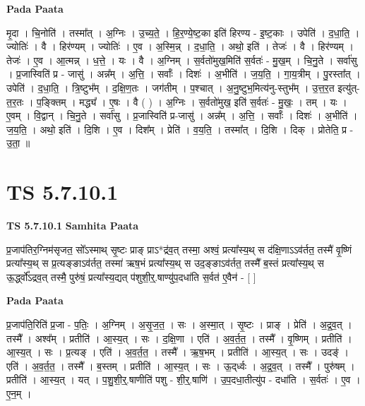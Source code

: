 \documentclass[17pt]{extarticle}
\begin{document}
\textbf{Pada Paata} \newline

मृ॒दा । चि॒नोति॑ । तस्मा᳚त् । अ॒ग्निः । उ॒च्य॒ते॒ । हि॒र॒ण्ये॒ष्ट॒का इति॑ हिरण्य - इ॒ष्ट॒काः । उपेति॑ । द॒धा॒ति॒ । ज्योतिः॑ । वै । हिर॑ण्यम् । ज्योतिः॑ । ए॒व । अ॒स्मि॒न्न् । द॒धा॒ति॒ । अथो॒ इति॑ । तेजः॑ । वै । हिर॑ण्यम् । तेजः॑ । ए॒व । आ॒त्मन्न् । ध॒त्ते॒ । यः । वै । अ॒ग्निम् । स॒र्वतो॑मुख॒मिति॑ स॒र्वतः॑ - मु॒ख॒म् । चि॒नु॒ते । सर्वा॑सु । प्र॒जास्विति॑ प्र - जासु॑ । अन्न᳚म् । अ॒त्ति॒ । सर्वाः᳚ । दिशः॑ । अ॒भीति॑ । ज॒य॒ति॒ । गा॒य॒त्रीम् । पु॒रस्ता᳚त् । उपेति॑ । द॒धा॒ति॒ । त्रि॒ष्टुभ᳚म् । द॒क्षि॒ण॒तः । जग॑तीम् । प॒श्चात् । अ॒नु॒ष्टुभ॒मित्य॑नु-स्तुभ᳚म् । उ॒त्त॒र॒त इत्यु॑त्-त॒र॒तः । प॒ङ्क्तिम् । मद्ध्य᳚ । ए॒षः । वै ( ) । अ॒ग्निः । स॒र्वतो॑मुख॒ इति॑ स॒र्वतः॑ - मु॒खः॒ । तम् । यः । ए॒वम् । वि॒द्वान् । चि॒नु॒ते । सर्वा॑सु । प्र॒जास्विति॑ प्र-जासु॑ । अन्न᳚म् । अ॒त्ति॒ । सर्वाः᳚ । दिशः॑ । अ॒भीति॑ । ज॒य॒ति॒ । अथो॒ इति॑ । दि॒शि । ए॒व । दिश᳚म् । प्रेति॑ । व॒य॒ति॒ । तस्मा᳚त् । दि॒शि । दिक् । प्रोतेति॒ प्र - उ॒ता॒ ॥  \newline




\section*{ TS 5.7.10.1 }

\textbf{TS 5.7.10.1 } \newline
\textbf{Samhita Paata} \newline

प्र॒जाप॑तिर॒ग्निम॑सृजत॒ सो᳚ऽस्माथ् सृ॒ष्टः प्राङ् प्राऽ*द्र॑व॒त् तस्मा॒ अश्वं॒ प्रत्या᳚स्य॒थ् स द॑क्षि॒णाऽऽव॑र्तत॒ तस्मै॑ वृ॒ष्णिं प्रत्या᳚स्य॒थ् स प्र॒त्यङ्ङाऽव॑र्तत॒ तस्मा॑ ऋष॒भं प्रत्या᳚स्य॒थ् स उद॒ङ्ङाऽव॑र्तत॒ तस्मै᳚ ब॒स्तं प्रत्या᳚स्य॒थ् स ऊ॒र्द्ध्वो᳚ऽद्रव॒त् तस्मै॒ पुरु॑षं॒ प्रत्या᳚स्य॒द्यत् प॑शुशी॒र्॒.षाण्यु॑प॒दधा॑ति स॒र्वत॑ ए॒वैन॑ - [  ] \newline

\textbf{Pada Paata} \newline

प्र॒जाप॑ति॒रिति॑ प्र॒जा - प॒तिः॒ । अ॒ग्निम् । अ॒सृ॒ज॒त॒ । सः । अ॒स्मा॒त् । सृ॒ष्टः । प्राङ् । प्रेति॑ । अ॒द्र॒व॒त् । तस्मै᳚ । अश्व᳚म् । प्रतीति॑ । आ॒स्य॒त् । सः । द॒क्षि॒णा । एति॑ । अ॒व॒र्त॒त॒ । तस्मै᳚ । वृ॒ष्णिम् । प्रतीति॑ । आ॒स्य॒त् । सः । प्र॒त्यङ् । एति॑ । अ॒व॒र्त॒त॒ । तस्मै᳚ । ऋ॒ष॒भम् । प्रतीति॑ । आ॒स्य॒त् । सः । उदङ्॑ । एति॑ । अ॒व॒र्त॒त॒ । तस्मै᳚ । ब॒स्तम् । प्रतीति॑ । आ॒स्य॒त् । सः । ऊ॒द्‌र्ध्वः । अ॒द्र॒व॒त् । तस्मै᳚ । पुरु॑षम् । प्रतीति॑ । आ॒स्य॒त् । यत् । प॒शु॒शी॒र्॒.षाणीति॑ पशु - शी॒र्॒.षाणि॑ । उ॒प॒दधा॒तीत्यु॑प - दधा॑ति । स॒र्वतः॑ । ए॒व । ए॒न॒म् ।  \newline
\end{document}
